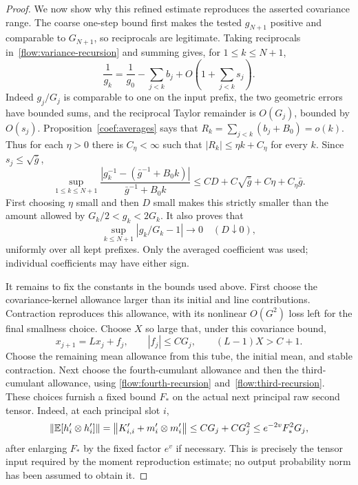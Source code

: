 \begin{proof}
We now show why this refined estimate reproduces the asserted covariance
range.  The coarse one-step bound first makes the tested $g_{N+1}$
positive and comparable to $G_{N+1}$, so reciprocals are legitimate.
Taking reciprocals in~\eqref{flow:variance-recursion} and summing gives,
for $1\le k\le N+1$,
\begin{equation}\label{flow:reciprocal}
 \frac1{g_k}=\frac1{g_0}-\sum_{j<k}b_j+
 O\left(1+\sum_{j<k}s_j\right).
\end{equation}
Indeed $g_j/G_j$ is comparable to one on the input prefix, the two
geometric errors have bounded sums, and the reciprocal Taylor remainder
is $O(G_j)$, bounded by $O(s_j)$.
Proposition~\ref{coef:averages} says that
$R_k=\sum_{j<k}(b_j+B_0)=o(k)$.  Thus for each $\eta>0$ there is
$C_\eta<\infty$ such that $|R_k|\le\eta k+C_\eta$ for every $k$.
Since $s_j\le\sqrt{\bar g}$,
\begin{equation}\label{flow:relative-reciprocal}
 \sup_{1\le k\le N+1}
 \frac{\left|g_k^{-1}-(\bar g^{-1}+B_0k)\right|}
      {\bar g^{-1}+B_0k}
 \le C D+C\sqrt{\bar g}+C\eta+C_\eta\bar g.
\end{equation}
First choosing $\eta$ small and then $D$ small makes this strictly
smaller than the amount allowed by $G_k/2<g_k<2G_k$.
It also proves that
\begin{equation}\label{flow:uniform-ratio}
 \sup_{k\le N+1}|g_k/G_k-1|\longrightarrow0\quad(D\downarrow0),
\end{equation}
uniformly over all kept prefixes.  Only the averaged coefficient was
used; individual coefficients may have either sign.

It remains to fix the constants in the bounds used above.  First choose
the covariance-kernel allowance larger than its initial and line
contributions.  Contraction reproduces this allowance, with its nonlinear
$O(G^2)$ loss left for the final smallness choice.  Choose $X$ so large
that, under this covariance bound,
\begin{equation}\label{flow:outward}
 x_{j+1}=Lx_j+f_j,\qquad |f_j|\le C G_j,
 \qquad (L-1)X>C+1.
\end{equation}
Choose the remaining mean allowance from this tube, the initial mean,
and stable contraction.  Next choose the fourth-cumulant allowance and
then the third-cumulant allowance, using
\eqref{flow:fourth-recursion} and~\eqref{flow:third-recursion}.
These choices furnish a fixed bound $F_*$ on the actual next principal
raw second tensor.  Indeed, at each principal slot $i$,
\[
 \left\lVert\mathbb E[h'_i\otimes h'_i]\right\rVert
 =\left\lVert K'_{i,i}+m'_i\otimes m'_i\right\rVert
 \le C G_j+C G_j^2\le e^{-2v}F_*^2G_j,
\]
after enlarging $F_*$ by the fixed factor $e^v$ if necessary.
This is precisely the tensor input required by the moment reproduction
estimate; no output probability norm has been assumed to obtain it.


\end{proof}
